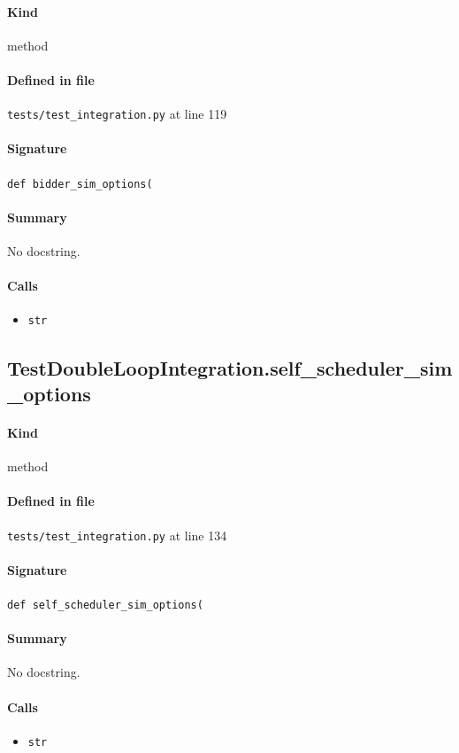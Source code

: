\documentclass[11pt]{report}
\begin{document}
\paragraph{Kind} method
\paragraph{Defined in file} \texttt{tests/test\_integration.py} at line 119
\paragraph{Signature} \texttt{def bidder\_sim\_options(}
\paragraph{Summary} No docstring.
\paragraph{Calls}
\begin{itemize}[leftmargin=*]
  \item \texttt{str}
\end{itemize}
\subsection{TestDoubleLoopIntegration.self\_scheduler\_sim\_options}
\label{def:tests-test_integration.py:TestDoubleLoopIntegration.self_scheduler_sim_options:L134}
\paragraph{Kind} method
\paragraph{Defined in file} \texttt{tests/test\_integration.py} at line 134
\paragraph{Signature} \texttt{def self\_scheduler\_sim\_options(}
\paragraph{Summary} No docstring.
\paragraph{Calls}
\begin{itemize}[leftmargin=*]
  \item \texttt{str}
\end{itemize}
\end{document}
